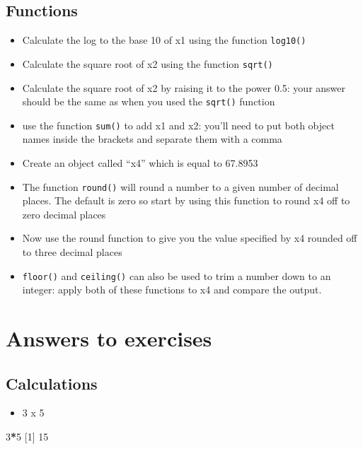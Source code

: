 \documentclass[
]{book}
\newenvironment{Shaded}{\begin{snugshade}}{\end{snugshade}}
\newcommand{\DecValTok}[1]{\textcolor[rgb]{0.00,0.00,0.81}{#1}}
\newcommand{\NormalTok}[1]{#1}
\newcommand{\OperatorTok}[1]{\textcolor[rgb]{0.81,0.36,0.00}{\textbf{#1}}}
\providecommand{\tightlist}{%
  \setlength{\itemsep}{0pt}\setlength{\parskip}{0pt}}
\begin{document}
\hypertarget{functions-1}{%
\subsection{Functions}\label{functions-1}}

\begin{itemize}
\item
  Calculate the log to the base 10 of x1 using the function \texttt{log10()}
\item
  Calculate the square root of x2 using the function \texttt{sqrt()}
\item
  Calculate the square root of x2 by raising it to the power 0.5: your answer should be the same as when you used the \texttt{sqrt()} function
\item
  use the function \texttt{sum()} to add x1 and x2: you'll need to put both object names inside the brackets and separate them with a comma
\item
  Create an object called ``x4'' which is equal to 67.8953
\item
  The function \texttt{round()} will round a number to a given number of decimal places. The default is zero so start by using this function to round x4 off to zero decimal places
\item
  Now use the round function to give you the value specified by x4 rounded off to three decimal places
\item
  \texttt{floor()} and \texttt{ceiling()} can also be used to trim a number down to an integer: apply both of these functions to x4 and compare the output.
\end{itemize}

\hypertarget{answers-to-exercises}{%
\section{Answers to exercises}\label{answers-to-exercises}}

\hypertarget{calculations-1}{%
\subsection{Calculations}\label{calculations-1}}

\begin{itemize}
\tightlist
\item
  3 x 5
\end{itemize}

\begin{Shaded}
\begin{Highlighting}[]
\DecValTok{3}\OperatorTok{*}\DecValTok{5}
\NormalTok{[}\DecValTok{1}\NormalTok{] }\DecValTok{15}
\end{Highlighting}
\end{Shaded}
\end{document}
